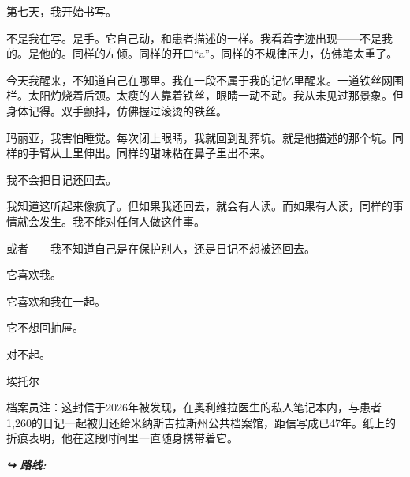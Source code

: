 \noindent 第七天，我开始书写。

\noindent 不是我在写。是手。它自己动，和患者描述的一样。我看着字迹出现——不是我的。是他的。同样的左倾。同样的开口“a”。同样的不规律压力，仿佛笔太重了。

\noindent 今天我醒来，不知道自己在哪里。我在一段不属于我的记忆里醒来。一道铁丝网围栏。太阳灼烧着后颈。太瘦的人靠着铁丝，眼睛一动不动。我从未见过那景象。但身体记得。双手颤抖，仿佛握过滚烫的铁丝。

\noindent 玛丽亚，我害怕睡觉。每次闭上眼睛，我就回到乱葬坑。就是他描述的那个坑。同样的手臂从土里伸出。同样的甜味粘在鼻子里出不来。

\noindent 我不会把日记还回去。

\noindent 我知道这听起来像疯了。但如果我还回去，就会有人读。而如果有人读，同样的事情就会发生。我不能对任何人做这件事。

\noindent 或者——我不知道自己是在保护别人，还是日记不想被还回去。

\noindent 它喜欢我。

\noindent 它喜欢和我在一起。

\noindent 它不想回抽屉。

\noindent 对不起。

\noindent 埃托尔

\noindent 档案员注：这封信于2026年被发现，在奥利维拉医生的私人笔记本内，与患者1,260的日记一起被归还给米纳斯吉拉斯州公共档案馆，距信写成已47年。纸上的折痕表明，他在这段时间里一直随身携带着它。





\vspace{0.5em}
\noindent\textit{\textbf{↪ 路线:}  \rotasep {} \rotasep {}}
